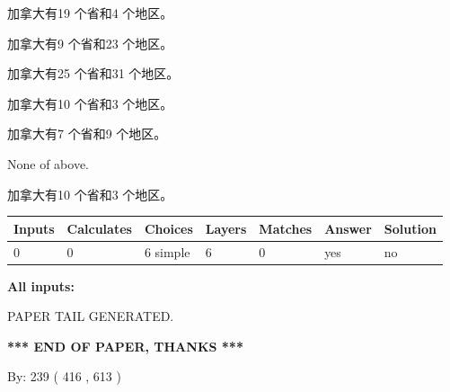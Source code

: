 \documentclass{ctexart}
\begin{document}
 
加拿大有19 个省和4 个地区。
 
 
加拿大有9 个省和23 个地区。
 
 
加拿大有25 个省和31 个地区。
 
 
加拿大有10 个省和3 个地区。
 
 
加拿大有7 个省和9 个地区。
 
 
 None of above.
 
 
\noindent{}
 
 
加拿大有10 个省和3 个地区。
 
 
\noindent{}
 
 
   
   
   
   
\noindent\begin{tabular}{|l|l|l|l|l|l|l|}
 \hline
Inputs & Calculates & Choices & Layers & Matches & Answer & Solution \\ \hline
 0  & 
 0  & 
 6
  simple  
  & 
 6  & 
 0  & 
  yes & 
  no 
  \\ \hline
 \end{tabular}
   
   
   
   
\noindent{}
   
   
   
   
\noindent\vspace{0.1in}\hspace{-0.08in} {\textbf{\Large{All inputs: }}}
   
   
   
   
   
   
 \vspace{0.2in}
 
   
   
\vspace{2.0in} PAPER TAIL GENERATED.
   
   
   
   
\vspace{1.0in} 
{\textbf{\large{ *** END OF PAPER, THANKS *** }}} 
   
   
\hspace{1.0in} By: 
 239 ( 416 ,  613 )
   
\end{document}
